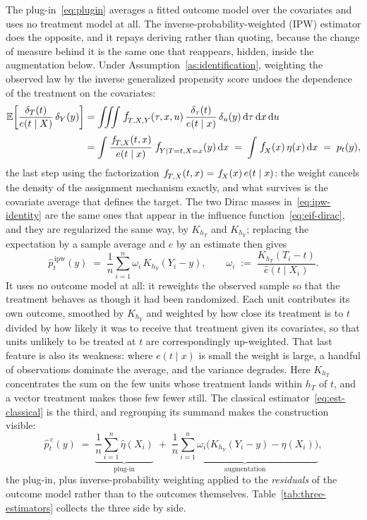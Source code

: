 \documentclass[11pt]{article}
\theoremstyle{plain}
\theoremstyle{definition}
\theoremstyle{remark}
\newcommand{\pE}{\ensuremath{\mathbb{E}}}
\newcommand{\pf}[1]{\ensuremath{\,\mathlarger{\textit{f}}_{#1}}}
\newcommand{\dd}{\,\mathrm{d}}
\newcommand{\gps}{e}
\begin{document}
The plug-in~\eqref{eq:plugin} averages a fitted outcome model over the covariates and uses no
treatment model at all. The inverse-probability-weighted (IPW) estimator does the opposite, and it
repays deriving rather than quoting, because the change of measure behind it is the same one
that reappears, hidden, inside the augmentation below. Under
Assumption~\ref{as:identification}, weighting the observed law by the inverse generalized
propensity score undoes the dependence of the treatment on the covariates:
\begin{equation}
\begin{aligned}
\pE\!\left[ \frac{\delta_{T}(t)}{\gps(t \mid X)}\, \delta_{Y}(y) \right]
&= \iiint \pf{T,X,Y}(\tau,x,u)\,
   \frac{\delta_{\tau}(t)}{\gps(t \mid x)}\, \delta_{u}(y) \dd\tau \dd x \dd u \\[2pt]
&= \int \frac{\pf{T,X}(t,x)}{\gps(t \mid x)}\,
   \pf{Y \mid T=t, X=x}(y) \dd x
 \;=\; \int \pf{X}(x)\,\eta(x) \dd x
 \;=\; p_t(y) ,
\end{aligned}
\label{eq:ipw-identity}
\end{equation}
the last step using the factorization $\pf{T,X}(t,x) = \pf{X}(x)\,\gps(t \mid x)$: the weight
cancels the density of the assignment mechanism exactly, and what survives is the covariate
average that defines the target. The two Dirac masses in~\eqref{eq:ipw-identity} are the same
ones that appear in the influence function~\eqref{eq:eif-dirac}, and they are regularized the
same way, by $K_{h_T}$ and $K_{h_Y}$; replacing the expectation by a sample average and $\gps$
by an estimate then gives
\begin{equation}
\widehat p^{\,\mathrm{ipw}}_t(y)
\;=\; \frac{1}{n}\sum_{i=1}^{n} \omega_i\, K_{h_Y}(Y_i - y) ,
\qquad
\omega_i \;:=\; \frac{K_{h_T}(T_i-t)}{\widehat\gps(t \mid X_i)} .
\label{eq:est-ipw}
\end{equation}
It uses no outcome model at all: it reweights the observed sample so that the treatment
behaves as though it had been randomized. Each unit contributes its own outcome, smoothed by
$K_{h_Y}$ and weighted by how close its treatment is to $t$ divided by how likely it was to
receive that treatment given its covariates, so that units unlikely to be treated at $t$ are
correspondingly up-weighted. That last feature is also its weakness: where $\gps(t\mid x)$ is
small the weight is large, a handful of observations dominate the average, and the variance
degrades. Here $K_{h_T}$ concentrates the sum on the few units whose
treatment lands within $h_T$ of $t$, and a vector treatment makes those few fewer still. The
classical estimator~\eqref{eq:est-classical} is the third, and regrouping its summand makes
the construction visible:
\begin{equation}
\widehat p^{\,\mathrm{c}}_t(y)
\;=\;
\underbrace{\frac{1}{n}\sum_{i=1}^{n} \widehat\eta(X_i)}_{\text{plug-in}}
\;+\;
\underbrace{\frac{1}{n}\sum_{i=1}^{n} \omega_i
\big( K_{h_Y}(Y_i-y) - \widehat\eta(X_i) \big)}_{\text{augmentation}} ,
\label{eq:est-classical-augmented}
\end{equation}
the plug-in, plus inverse-probability weighting applied to the \emph{residuals} of the outcome
model rather than to the outcomes themselves. Table~\ref{tab:three-estimators} collects the
three side by side.
\end{document}
